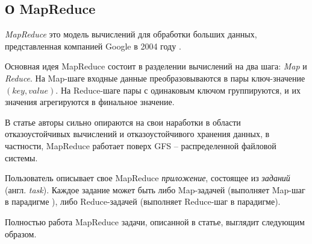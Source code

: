 \documentclass[../diploma.tex]{subfile}
\begin{document}
    \subsection{О MapReduce}\label{sec:review:subsec:whatismapreduce}
    
    \textit{MapReduce} это модель вычислений для обработки больших данных,
    представленная компанией Google в 2004 году \cite{google_mapreduce}. 
    
    Основная идея MapReduce состоит в разделении вычислений на два шага:
    \textit{Map} и \textit{Reduce}. На Map-шаге входные данные преобразовываются
    в пары ключ-значение $(key, value)$. На Reduce-шаге пары с одинаковым ключом
    группируются, и их значения агрегируются в финальное значение. 

    В статье авторы сильно опираются на свои наработки в области
    отказоустойчивых вычислений и отказоустойчивого хранения данных, в
    частности, MapReduce работает поверх GFS \cite{google_gfs} -- распределенной
    файловой системы. 

    Пользователь описывает свое MapReduce {\it приложение}, состоящее из {\it
    заданий} (англ. {\it task}). Каждое задание  может быть либо Map-задачей
    (выполняет Map-шаг в парадигме ), либо Reduce-задачей (выполняет Reduce-шаг
    в парадигме).

    Полностью работа MapReduce задачи, описанной в статье, выглядит следующим
    образом.    
\end{document}
